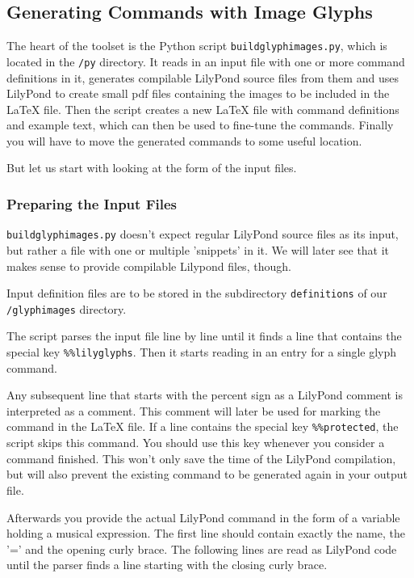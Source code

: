 \documentclass{article}
\begin{document}
\subsection{Generating Commands with Image Glyphs}
\label{generating_commands_image}

The heart of the toolset is the Python script \texttt{buildglyphimages.py}, which is located in the \texttt{/py} directory.
It reads in an input file with one or more command definitions in it, generates compilable LilyPond source files from them and uses LilyPond to create small pdf files containing the images to be included in the \LaTeX{} file.
Then the script creates a new \LaTeX{} file with command definitions and example text, which can then be used to fine-tune the commands.
Finally you will have to move the generated commands to some useful location.

But let us start with looking at the form of the input files.


\subsubsection{Preparing the Input Files}
\label{subsubsec:BGI_preparing_input}
\texttt{buildglyphimages.py} doesn't expect regular LilyPond source files as its input, but rather a file with one or multiple 'snippets' in it. 
We will later see that it makes sense to provide compilable Lilypond files, though.

Input definition files are to be stored in the subdirectory \texttt{definitions} of our \texttt{/glyphimages} directory.

The script parses the input file line by line until it finds a line that contains the special key \verb|%%lilyglyphs|.																																																					
Then it starts reading in an entry for a single glyph command.

Any subsequent line that starts with the percent sign as a LilyPond comment is interpreted as a comment.
This comment will later be used for marking the command in the \LaTeX{} file.
If a line contains the special key \verb|%%protected|, the script skips this command.
You should use this key whenever you consider a command finished.
This won't only save the time of the LilyPond compilation, but will also prevent the existing command to be generated again in your output file.

Afterwards you provide the actual LilyPond command in the form of a variable holding a musical expression.
The first line should contain exactly the name, the '=' and the opening curly brace.
The following lines are read as LilyPond code until the parser finds a line starting with the closing curly brace.
\end{document}
